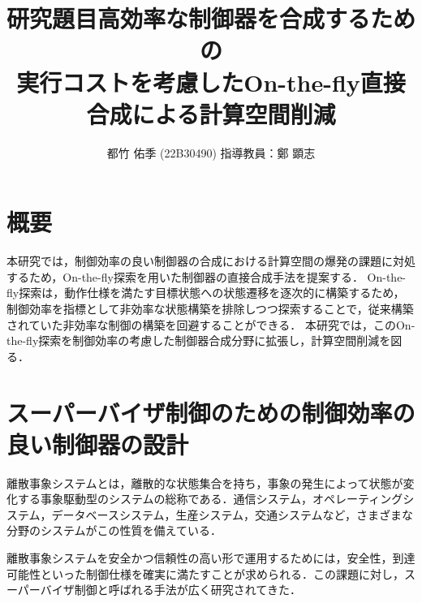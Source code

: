 \documentclass[11pt]{jarticle}
\begin{document}

\title{研究題目}
\title{高効率な制御器を合成するための\\実行コストを考慮したOn-the-fly直接合成による計算空間削減}
\author{都竹 佑季 (22B30490) \;\; 指導教員：鄭 顕志}
\date{\empty} %
\maketitle %
\thispagestyle{fancy}


\section{概要} %
本研究では，制御効率の良い制御器の合成における計算空間の爆発の課題に対処するため，On-the-fly探索を用いた制御器の直接合成手法を提案する．
On-the-fly探索は，動作仕様を満たす目標状態への状態遷移を逐次的に構築するため，制御効率を指標として非効率な状態構築を排除しつつ探索することで，従来構築されていた非効率な制御の構築を回避することができる．
本研究では，このOn-the-fly探索を制御効率の考慮した制御器合成分野に拡張し，計算空間削減を図る．

\section{スーパーバイザ制御のための制御効率の良い制御器の設計}
離散事象システムとは，離散的な状態集合を持ち，事象の発生によって状態が変化する事象駆動型のシステムの総称である．通信システム，オペレーティングシステム，データベースシステム，生産システム，交通システムなど，さまざまな分野のシステムがこの性質を備えている．

離散事象システムを安全かつ信頼性の高い形で運用するためには，安全性，到達可能性といった制御仕様を確実に満たすことが求められる．この課題に対し，スーパーバイザ制御と呼ばれる手法が広く研究されてきた．
\end{document}

